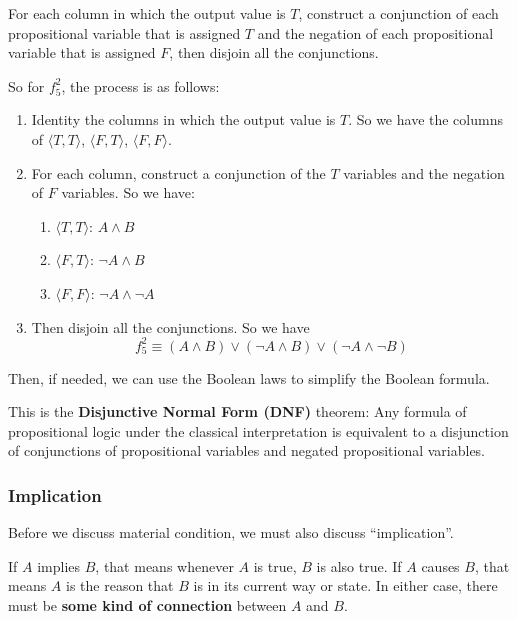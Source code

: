 \documentclass[12pt, letterpaper]{article}
\begin{document}
For each column in which the output value is $T$, construct a conjunction of
each propositional variable that is assigned $T$ and the negation of each
propositional variable that is assigned $F$, then disjoin all the conjunctions.

So for $f_5^2$, the process is as follows:
\begin{enumerate}
  \item Identity the columns in which the output value is $T$. So we have the
    columns of $\langle T, T \rangle$, $\langle F, T \rangle$,
    $\langle F, F \rangle$.
  \item For each column, construct a conjunction of the $T$ variables and the
    negation of $F$ variables. So we have:
    \begin{enumerate}
      \item $\langle T, T \rangle$: $A \land B$
      \item $\langle F, T \rangle$: $\lnot A \land B$
      \item $\langle F, F \rangle$: $\lnot A \land \lnot A$
    \end{enumerate}
  \item Then disjoin all the conjunctions. So we have \[ f_5^2 \equiv (A \land
    B) \lor (\lnot A \land B) \lor (\lnot A \land \lnot B) \]
\end{enumerate}

Then, if needed, we can use the Boolean laws to simplify the Boolean formula.

This is the \textbf{Disjunctive Normal Form (DNF)} theorem: Any formula of
propositional logic under the classical interpretation is equivalent to a
disjunction of conjunctions of propositional variables and negated propositional
variables.

\subsubsection{Implication}

Before we discuss material condition, we must also discuss ``implication''.

If $A$ implies $B$, that means whenever $A$ is true, $B$ is also true. If $A$
causes $B$, that means $A$ is the reason that $B$ is in its current way or
state. In either case, there must be \textbf{some kind of connection} between
$A$ and $B$.
\end{document}
